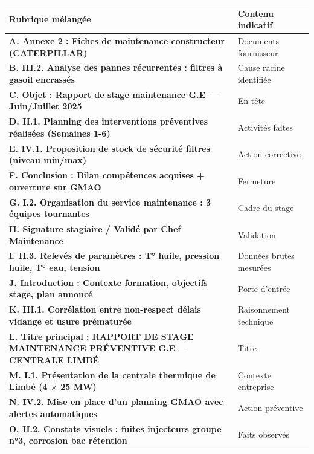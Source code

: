 \documentclass[11pt]{article}
\begin{document}
\begin{center}
\begin{tabularx}{\linewidth}{|>{\bfseries}l|X|}
\hline
\textbf{Rubrique mélangée} & \textbf{Contenu indicatif} \\
\hline
A. Annexe 2 : Fiches de maintenance constructeur (CATERPILLAR) & Documents fournisseur \\
B. III.2. Analyse des pannes récurrentes : filtres à gasoil encrassés & Cause racine identifiée \\
C. Objet : Rapport de stage maintenance G.E — Juin/Juillet 2025 & En-tête \\
D. II.1. Planning des interventions préventives réalisées (Semaines 1-6) & Activités faites \\
E. IV.1. Proposition de stock de sécurité filtres (niveau min/max) & Action corrective \\
F. Conclusion : Bilan compétences acquises + ouverture sur GMAO & Fermeture \\
G. I.2. Organisation du service maintenance : 3 équipes tournantes & Cadre du stage \\
H. Signature stagiaire / Validé par Chef Maintenance & Validation \\
I. II.3. Relevés de paramètres : T° huile, pression huile, T° eau, tension & Données brutes mesurées \\
J. Introduction : Contexte formation, objectifs stage, plan annoncé & Porte d'entrée \\
K. III.1. Corrélation entre non-respect délais vidange et usure prématurée & Raisonnement technique \\
L. Titre principal : RAPPORT DE STAGE MAINTENANCE PRÉVENTIVE G.E — CENTRALE LIMBÉ & Titre \\
M. I.1. Présentation de la centrale thermique de Limbé (4 $\times$ 25 MW) & Contexte entreprise \\
N. IV.2. Mise en place d'un planning GMAO avec alertes automatiques & Action préventive \\
O. II.2. Constats visuels : fuites injecteurs groupe n°3, corrosion bac rétention & Faits observés \\
\hline
\end{tabularx}
\end{center}
\end{document}
